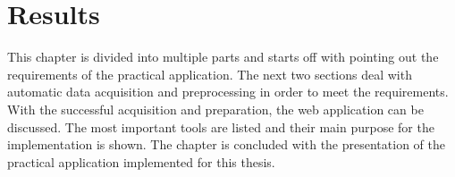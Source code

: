 \section{Results}
\label{s:results}
This chapter is divided into multiple parts and starts off with pointing out the requirements of the practical application. The next two sections deal with automatic data acquisition and preprocessing in order to meet the requirements.
With the successful acquisition and preparation, the web application can be discussed. The most important tools are listed and their main purpose for the implementation is shown. The chapter is concluded with the presentation of the practical application implemented for this thesis.


